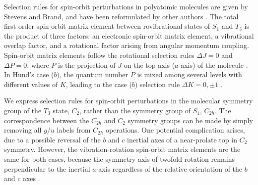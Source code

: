 \documentclass[12pt]{mitthesis}
\begin{document}

Selection rules for spin-orbit perturbations in polyatomic molecules
are given by Stevens and Brand, and have been reformulated by other
authors \cite{stevens73, howard78, dupre84}.  The total first-order
spin-orbit matrix element between rovibrational states of $S_1$ and
$T_3$ is the product of three factors: an electronic spin-orbit matrix
element, a vibrational overlap factor, and a rotational factor arising
from angular momentum coupling.  Spin-orbit matrix elements follow the
rotational selection rules $\Delta J = 0$ and $\Delta P = 0$, where
$P$ is the projection of $J$ on the top axis ($a$-axis) of the
molecule \cite{hougen64}.  In Hund's case ($b$), the quantum number
$P$ is mixed among several levels with different values of $K$,
leading to the case ($b$) selection rule $\Delta K = 0, \pm 1$
\cite{hougen64, stevens73}.

We express selection rules for spin-orbit perturbations in the
molecular symmetry group of the $T_3$ state, $C_2$, rather than the
symmetry group of $S_1$, $C_{2h}$.  The correspondence between the
$C_{2h}$ and $C_{2}$ symmetry groups can be made by simply removing
all $g$/$u$ labels from $C_{2h}$ operations.  One potential
complication arises, due to a possible reversal of the $b$ and $c$
inertial axes of a near-prolate top in $C_2$ symmetry.  However, the
vibration-rotation spin-orbit matrix elements are the same for both
cases, because the symmetry axis of twofold rotation remains
perpendicular to the inertial $a$-axis regardless of the relative
orientation of the $b$ and $c$ axes \cite{hougen64}.
\end{document}
